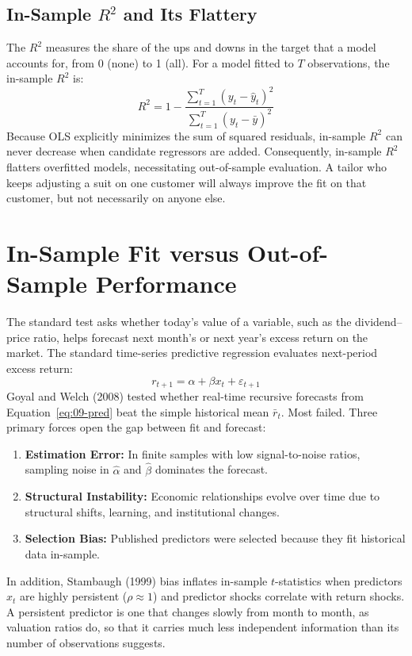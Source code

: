 \subsection{In-Sample $R^2$ and Its Flattery}
The $R^2$ measures the share of the ups and downs in the target that a model accounts for, from 0 (none) to 1 (all). For a model fitted to $T$ observations, the in-sample $R^2$ is:
\begin{equation}
  R^2 = 1 - \frac{\sum_{t=1}^T (y_t - \hat{y}_t)^2}{\sum_{t=1}^T (y_t - \bar{y})^2}
  \label{eq:09-r2}
\end{equation}
Because OLS explicitly minimizes the sum of squared residuals, in-sample $R^2$ can never decrease when candidate regressors are added. Consequently, in-sample $R^2$ flatters overfitted models, necessitating out-of-sample evaluation. A tailor who keeps adjusting a suit on one customer will always improve the fit on that customer, but not necessarily on anyone else.


\section{In-Sample Fit versus Out-of-Sample Performance}
\label{sec:09-insample}

The standard test asks whether today's value of a variable, such as the dividend--price ratio, helps forecast next month's or next year's excess return on the market. The standard time-series predictive regression evaluates next-period excess return:
\begin{equation}
  r_{t+1} = \alpha + \beta x_t + \varepsilon_{t+1}
  \label{eq:09-pred}
\end{equation}
Goyal and Welch (2008) tested whether real-time recursive forecasts from Equation~\eqref{eq:09-pred} beat the simple historical mean $\bar{r}_t$. Most failed. Three primary forces open the gap between fit and forecast:
\begin{enumerate}
  \item \textbf{Estimation Error:} In finite samples with low signal-to-noise ratios, sampling noise in $\hat{\alpha}$ and $\hat{\beta}$ dominates the forecast.
  \item \textbf{Structural Instability:} Economic relationships evolve over time due to structural shifts, learning, and institutional changes.
  \item \textbf{Selection Bias:} Published predictors were selected because they fit historical data in-sample.
\end{enumerate}
In addition, Stambaugh (1999) bias inflates in-sample $t$-statistics when predictors $x_t$ are highly persistent ($\rho \approx 1$) and predictor shocks correlate with return shocks. A persistent predictor is one that changes slowly from month to month, as valuation ratios do, so that it carries much less independent information than its number of observations suggests.


